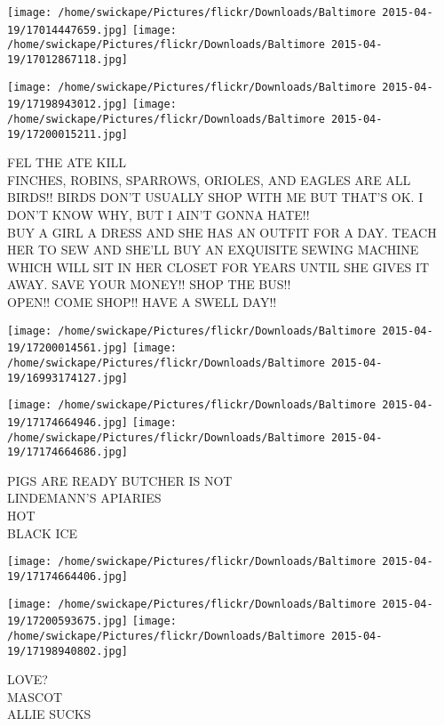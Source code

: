 \documentclass[10pt,letterpaper]{article}
\begin{document}
\texttt{[image: /home/swickape/Pictures/flickr/Downloads/Baltimore 2015-04-19/17014447659.jpg]}
\texttt{[image: /home/swickape/Pictures/flickr/Downloads/Baltimore 2015-04-19/17012867118.jpg]}

\texttt{[image: /home/swickape/Pictures/flickr/Downloads/Baltimore 2015-04-19/17198943012.jpg]}
\texttt{[image: /home/swickape/Pictures/flickr/Downloads/Baltimore 2015-04-19/17200015211.jpg]}

FEL THE ATE KILL\\
FINCHES, ROBINS, SPARROWS, ORIOLES, AND EAGLES ARE ALL BIRDS!!  BIRDS DON'T USUALLY SHOP WITH ME BUT THAT'S OK.  I DON'T KNOW WHY, BUT I AIN'T GONNA HATE!!\\
BUY A GIRL A DRESS AND SHE HAS AN OUTFIT FOR A DAY.  TEACH HER TO SEW AND SHE'LL BUY AN EXQUISITE SEWING MACHINE WHICH WILL SIT IN HER CLOSET FOR YEARS UNTIL SHE GIVES IT AWAY.  SAVE YOUR MONEY!! SHOP THE BUS!!\\
OPEN!! COME SHOP!! HAVE A SWELL DAY!!\\
\pagebreak

\texttt{[image: /home/swickape/Pictures/flickr/Downloads/Baltimore 2015-04-19/17200014561.jpg]}
\texttt{[image: /home/swickape/Pictures/flickr/Downloads/Baltimore 2015-04-19/16993174127.jpg]}

\texttt{[image: /home/swickape/Pictures/flickr/Downloads/Baltimore 2015-04-19/17174664946.jpg]}
\texttt{[image: /home/swickape/Pictures/flickr/Downloads/Baltimore 2015-04-19/17174664686.jpg]}

PIGS ARE READY BUTCHER IS NOT\\
LINDEMANN'S APIARIES\\
HOT\\
BLACK ICE\\
\pagebreak

\texttt{[image: /home/swickape/Pictures/flickr/Downloads/Baltimore 2015-04-19/17174664406.jpg]}

\vspace{0.25in}
\texttt{[image: /home/swickape/Pictures/flickr/Downloads/Baltimore 2015-04-19/17200593675.jpg]}
\texttt{[image: /home/swickape/Pictures/flickr/Downloads/Baltimore 2015-04-19/17198940802.jpg]}

LOVE?\\
MASCOT\\
ALLIE SUCKS\\
\pagebreak
\end{document}
